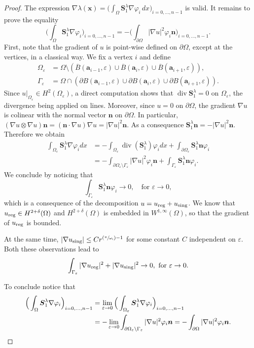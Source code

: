\documentclass[JEP,XML,SOM,Unicode,ThmDefs,NoFloatCountersInSection,published]{cedram}
\let\ra\to
\newcommand{\Psfrac}[2]{(\sfrac{#1}{#2})}
\theoremstyle{plain}
\theoremstyle{definition}
\newcommand{\di}{\operatorname{div}}
\newcommand{\bo}[1]{{\boldsymbol#1}}
\newcommand{\reg}{\textup{reg}}
\newcommand{\sing}{\textup{sing}}
\newcommand{\vps}{\varepsilon}
\newcommand{\Om}{\Omega}
\newcommand{\om}{\omega}
\newcommand{\vphi}{\varphi}
\newcommand{\sm}{\setminus}
\newcommand{\ov}{\overline}
\begin{document}
\begin{proof}
The expression
$\nabla \lambda(\bo x) = \big (\int_\Omega \bo S_1^\lambda \nabla \varphi_i\, dx\big)_{i=0,\dots,n-1}$ is valid. It remains to prove the equality
\[
\Big (\int_\Omega \bo S_1^\lambda \nabla \varphi_i\Big)_{i=0,\dots,n-1}= -\Big (\int_{\partial \Omega} |\nabla u|^2 \varphi_i \bo n\Big)_{i=0,\dots,n-1}.
\]
First, note that the gradient of $u$ is point-wise defined on $\partial \Om$, except at the vertices, in a classical way. We fix a vertex $i$ and define
\begin{align*}
\Om_\vps&= \Om \setminus (\ov B(\bo a_{i-1}, \vps) \cup \ov B(\bo a_{i}, \vps)\cup \ov B(\bo a_{i+1}, \vps)),
\\
\Gamma_\vps&= \Om \cap (\partial B(\bo a_{i-1}, \vps) \cup \partial B(\bo a_{i}, \vps)\cup \partial B(\bo a_{i+1}, \vps)).
\end{align*}
Since $u|_{\Om_
\vps} \in H^2(\Om_\vps)$, a direct computation shows that $\di \bo S_1^\lambda=0$ on $\Omega_\varepsilon$, the divergence being applied on lines. Moreover, since $u=0$ on $\partial \Omega$, the gradient $\nabla u$ is colinear with the normal vector $\bo n$ on $\partial \Omega$. In particular, $(\nabla u \otimes \nabla u) \bo n = (\bo n \cdot \nabla u) \nabla u = |\nabla u |^2 \bo n$. As a consequence $\bo S_1^\lambda \bo n = -|\nabla u|^2 \bo n$. Therefore we obtain
\begin{align*}
\int_{\Omega_\varepsilon} \bo S_1^\lambda \nabla \varphi_i dx &= -\int_{\Omega_\varepsilon} \di (\bo S_1^\lambda) \varphi_i dx +\int_{\partial \Omega_\varepsilon} \bo S_1^\lambda \bo n \varphi_i \\
&= -\int_{\partial \Omega_\varepsilon \setminus \Gamma_\varepsilon} |\nabla u|^2 \varphi_i \bo n + \int_{\Gamma_\varepsilon} \bo S_1^\lambda \bo n \varphi_i.
\end{align*}
We conclude by noticing that
\[
\int_{ \Gamma_\vps} \bo S_1^\lambda \bo n \varphi_i \to 0, \quad\text{for } \vps \ra 0,
\]
which is a consequence of the decomposition $u=u_{\reg}+u_{\sing}$. We know that $u_{\reg} \in H^{2+\delta} (\Om)$ and
$H^{2+\delta} (\Om)$ is embedded in $W^{1, \infty} (\Om)$, so that the gradient of $u_{\reg} $ is bounded.

At the same time, $|\nabla u_{\sing}|\le C r^{\Psfrac{\pi}{\om_i} -1}$ for some constant $C$ independent on $\vps$. Both these observations lead to
\[
\int_{ \Gamma_\vps} |\nabla u_{\reg}|^2 + |\nabla u_{\sing}|^2 \ra 0, \mbox{ for } \vps \ra 0.
\]

To conclude notice that
\begin{align*}
\Big (\int_\Omega \bo S_1^\lambda \nabla \varphi_i\Big)_{i=0,\dots,n-1}&= \lim_{\vps \ra 0} \Big (\int_{\Omega_\vps} \bo S_1^\lambda \nabla \varphi_i\Big)_{i=0,\dots,n-1}\\
&= - \lim_{\vps \ra 0} \int_{\partial \Om_\vps\sm \Gamma_\vps} |\nabla u|^2 \vphi_i \bo n= -\int_{\partial \Om} |\nabla u|^2 \vphi_i\bo n.\qedhere
\end{align*}
\end{proof}
\end{document}
